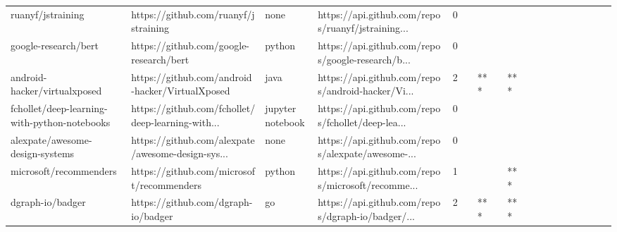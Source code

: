 \begin{tabular}{llllrlllllllllllll}
ruanyf/jstraining                                  &               https://github.com/ruanyf/jstraining &              none &  https://api.github.com/repos/ruanyf/jstraining... &       0 &         &        &           &                &                 &        &           &           &          &          &       &              &          \\
google-research/bert                               &            https://github.com/google-research/bert &            python &  https://api.github.com/repos/google-research/b... &       0 &         &        &           &                &                 &        &           &           &          &          &       &              &          \\
android-hacker/virtualxposed                       &    https://github.com/android-hacker/VirtualXposed &              java &  https://api.github.com/repos/android-hacker/Vi... &       2 &         &    *** &           &            *** &                 &        &           &           &          &          &       &              &          \\
fchollet/deep-learning-with-python-notebooks       &  https://github.com/fchollet/deep-learning-with... &  jupyter notebook &  https://api.github.com/repos/fchollet/deep-lea... &       0 &         &        &           &                &                 &        &           &           &          &          &       &              &          \\
alexpate/awesome-design-systems                    &  https://github.com/alexpate/awesome-design-sys... &              none &  https://api.github.com/repos/alexpate/awesome-... &       0 &         &        &           &                &                 &        &           &           &          &          &       &              &          \\
microsoft/recommenders                             &          https://github.com/microsoft/recommenders &            python &  https://api.github.com/repos/microsoft/recomme... &       1 &         &        &           &            *** &                 &        &           &           &          &          &       &              &          \\
dgraph-io/badger                                   &                https://github.com/dgraph-io/badger &                go &  https://api.github.com/repos/dgraph-io/badger/... &       2 &         &    *** &           &            *** &                 &        &           &           &          &          &       &              &          \\

\end{tabular}
